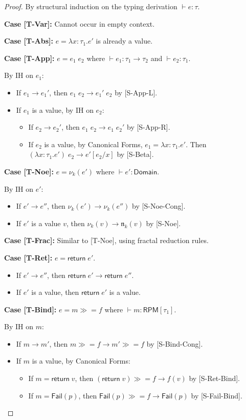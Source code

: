 \documentclass[11pt,twoside,openright]{book}
\theoremstyle{definition}
\theoremstyle{plain}
\theoremstyle{remark}
\newcommand{\noe}[1]{\nu_{#1}}
\newcommand{\rpmret}{\mathsf{return}}
\newcommand{\rpmbind}{\mathbin{\gg\!=}}
\newcommand{\smallstep}{\to}
\newcommand{\Failed}{\mathsf{Fail}}
\begin{document}
\begin{proof}
By structural induction on the typing derivation $\vdash e : \tau$.

\textbf{Case [T-Var]:} Cannot occur in empty context.

\textbf{Case [T-Abs]:} $e = \lambda x:\tau_1. e'$ is already a value.

\textbf{Case [T-App]:} $e = e_1\; e_2$ where $\vdash e_1 : \tau_1 \to \tau_2$ and $\vdash e_2 : \tau_1$.

By IH on $e_1$:
\begin{itemize}
  \item If $e_1 \smallstep e_1'$, then $e_1\; e_2 \smallstep e_1'\; e_2$ by [S-App-L].
  \item If $e_1$ is a value, by IH on $e_2$:
    \begin{itemize}
      \item If $e_2 \smallstep e_2'$, then $e_1\; e_2 \smallstep e_1\; e_2'$ by [S-App-R].
      \item If $e_2$ is a value, by Canonical Forms, $e_1 = \lambda x:\tau_1. e'$.
        Then $(\lambda x:\tau_1. e')\; e_2 \smallstep e'[e_2/x]$ by [S-Beta].
    \end{itemize}
\end{itemize}

\textbf{Case [T-Noe]:} $e = \noe{k}(e')$ where $\vdash e' : \mathsf{Domain}$.

By IH on $e'$:
\begin{itemize}
  \item If $e' \smallstep e''$, then $\noe{k}(e') \smallstep \noe{k}(e'')$ by [S-Noe-Cong].
  \item If $e'$ is a value $v$, then $\noe{k}(v) \smallstep \mathfrak{n}_k(v)$ by [S-Noe].
\end{itemize}

\textbf{Case [T-Frac]:} Similar to [T-Noe], using fractal reduction rules.

\textbf{Case [T-Ret]:} $e = \rpmret\; e'$.
\begin{itemize}
  \item If $e' \smallstep e''$, then $\rpmret\; e' \smallstep \rpmret\; e''$.
  \item If $e'$ is a value, then $\rpmret\; e'$ is a value.
\end{itemize}

\textbf{Case [T-Bind]:} $e = m \rpmbind f$ where $\vdash m : \mathsf{RPM}[\tau_1]$.

By IH on $m$:
\begin{itemize}
  \item If $m \smallstep m'$, then $m \rpmbind f \smallstep m' \rpmbind f$ by [S-Bind-Cong].
  \item If $m$ is a value, by Canonical Forms:
    \begin{itemize}
      \item If $m = \rpmret\; v$, then $(\rpmret\; v) \rpmbind f \smallstep f(v)$ by [S-Ret-Bind].
      \item If $m = \Failed(p)$, then $\Failed(p) \rpmbind f \smallstep \Failed(p)$ by [S-Fail-Bind].
    \end{itemize}
\end{itemize}


\end{proof}
\end{document}
